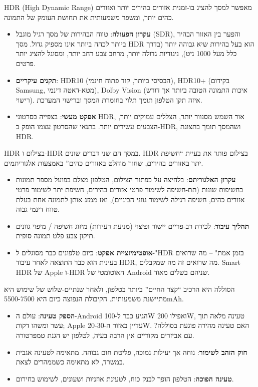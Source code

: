 
HDR (High Dynamic Range) מאפשר למסך להציג בו-זמנית אזורים בהירים יותר ואזורים כהים יותר, ומשפר משמעותית את תחושת העומק של התמונה.

\begin{itemize}
  \item \textbf{עקרון הפעולה}: טווח הבהירות של מסך רגיל מוגבל (SDR), והפער בין האזור הבהיר ביותר לכהה ביותר אינו מספיק גדול. מסך HDR הוא בעל בהירות שיא גבוהה יותר (בדרך כלל מעל 1000 ניט), ניגודיות גדולה יותר, מרחב צבע רחב יותר, ומסוגל להציג יותר פרטים.
  \item \textbf{תקנים עיקריים}: HDR10 (הבסיסי ביותר, קוד פתוח חינמי), HDR10+ (בקידום Samsung, מטא-דאטה דינמי), Dolby Vision (איכות התמונה הטובה ביותר אך דורש רישוי). איזה תקן הטלפון תומך תלוי בחומרת המסך וברישוי המערכת.
  \item \textbf{אפקט מעשי}: בצפייה בסרטוני HDR, אור השמש מסנוור יותר, הצללים עמוקים יותר, הצבעים עשירים יותר. בתנאי שהסרטון עצמו הופק ב-HDR, ושהמסך תומך בתצוגת HDR.
\end{itemize}


HDR בצילום ו-HDR במסך הם שני דברים שונים. HDR בצילום פותר את בעיית “חשיפת יתר באזורים בהירים, שחור מוחלט באזורים כהים” באמצעות אלגוריתמים.

\begin{itemize}
  \item \textbf{עקרון האלגוריתם}: בלחיצה על כפתור הצילום, הטלפון מצלם בפועל מספר תמונות בחשיפות שונות (תת-חשיפה לשימור פרטי אזורים בהירים, חשיפת יתר לשימור פרטי אזורים כהים, חשיפה רגילה לשימור גווני הביניים), ואז ממזג אותן לתמונה אחת בעלת טווח דינמי גבוה.
  \item \textbf{תהליך עיבוד}: לכידת רב-פריים יישור ופיצוי (מניעת רעידות) מיזוג חשיפה / מיפוי גוונים תיקון צבע פלט תמונה סופית.
  \item \textbf{אופטימיזציית אפקט}: כיום טלפונים כבר מסוגלים ל-"HDR בזמן אמת" – מה שרואים בעינית הוא כבר התוצאה לאחר עיבוד HDR, מה שרואים זה מה שמקבלים. Smart HDR של Apple ו-HDR האוטומטי של Android שניהם בשלים מאוד.
\end{itemize}


הסוללה היא הרכיב “קצר החיים” ביותר בטלפון, ולאחר שנתיים-שלוש של שימוש היא מתיישנת משמעותית. הקיבולת הנפוצה כיום היא 5500-7500mAh.

\begin{itemize}
  \item \textbf{הספק טעינה}: עולם ה-Android הגיע כבר ל-100W ואפילו 200W, טעינה מלאה תוך עשר ומשהו דקות; Apple עדיין באזור ה-20-30W. האם טעינה מהירה פוגעת בסוללה? עם אביזרים מקוריים אין הרבה בעיה, לטלפון יש הגנת טמפרטורה.
  \item \textbf{חוק הזהב לשימור}: נוחה אך יעילות נמוכה, פליטת חום גבוהה. מתאימה לטעינה אגבית במשרד, לא מתאימה כשממהרים לצאת.
  \item \textbf{טעינה הפוכה}: הטלפון הופך לבנק כוח, לטעינת אוזניות ושעונים, לשימוש בחירום.
\end{itemize}

